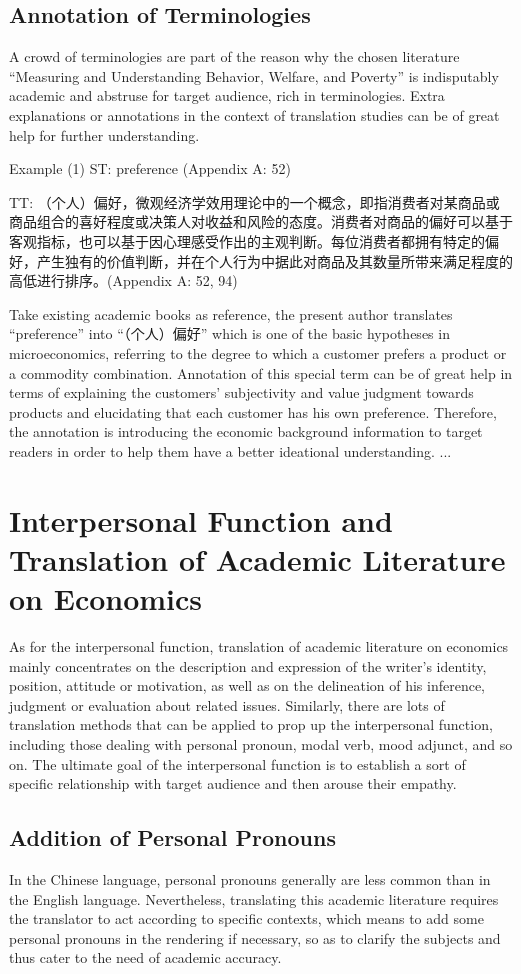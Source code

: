 	\subsection{Annotation of Terminologies }
	A crowd of terminologies are part of the reason why the chosen literature “Measuring and Understanding Behavior, Welfare, and Poverty” is indisputably academic and abstruse for target audience, rich in terminologies. Extra explanations or annotations in the context of translation studies can be of great help for further understanding.
	
	Example (1) ST: preference (Appendix A: 52)
	
	TT: （个人）偏好，微观经济学效用理论中的一个概念，即指消费者对某商品或商品组合的喜好程度或决策人对收益和风险的态度。消费者对商品的偏好可以基于客观指标，也可以基于因心理感受作出的主观判断。每位消费者都拥有特定的偏好，产生独有的价值判断，并在个人行为中据此对商品及其数量所带来满足程度的高低进行排序。(Appendix A: 52, 94)
	
	Take existing academic books as reference, the present author translates “preference” into “（个人）偏好” which is one of the basic hypotheses in microeconomics, referring to the degree to which a customer prefers a product or a commodity combination. Annotation of this special term can be of great help in terms of explaining the customers’ subjectivity and value judgment towards products and elucidating that each customer has his own preference. Therefore, the annotation is introducing the economic background information to target readers in order to help them have a better ideational understanding.
	...
\section{Interpersonal Function and Translation of Academic Literature on Economics}

As for the interpersonal function, translation of academic literature on economics mainly concentrates on the description and expression of the writer’s identity, position, attitude or motivation, as well as on the delineation of his inference, judgment or evaluation about related issues. Similarly, there are lots of translation methods that can be applied to prop up the interpersonal function, including those dealing with personal pronoun, modal verb, mood adjunct, and so on. The ultimate goal of the interpersonal function is to establish a sort of specific relationship with target audience and then arouse their empathy.
	\subsection{Addition of Personal Pronouns}
	In the Chinese language, personal pronouns generally are less common than in the English language. Nevertheless, translating this academic literature requires the translator to act according to specific contexts, which means to add some personal pronouns in the rendering if necessary, so as to clarify the subjects and thus cater to the need of academic accuracy.
	
